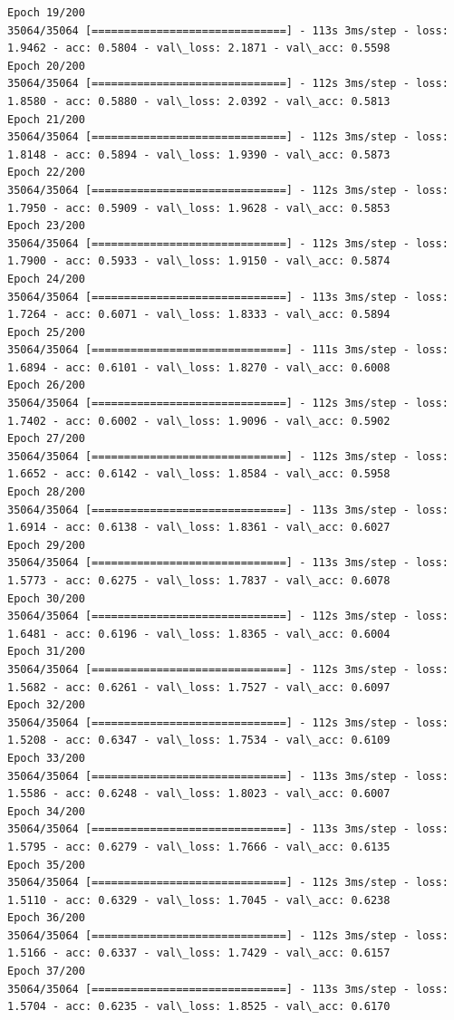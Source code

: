 \documentclass[11pt]{article}
\begin{document}
\begin{Verbatim}[commandchars=\\\{\}]
Epoch 19/200
35064/35064 [==============================] - 113s 3ms/step - loss: 1.9462 - acc: 0.5804 - val\_loss: 2.1871 - val\_acc: 0.5598
Epoch 20/200
35064/35064 [==============================] - 112s 3ms/step - loss: 1.8580 - acc: 0.5880 - val\_loss: 2.0392 - val\_acc: 0.5813
Epoch 21/200
35064/35064 [==============================] - 112s 3ms/step - loss: 1.8148 - acc: 0.5894 - val\_loss: 1.9390 - val\_acc: 0.5873
Epoch 22/200
35064/35064 [==============================] - 112s 3ms/step - loss: 1.7950 - acc: 0.5909 - val\_loss: 1.9628 - val\_acc: 0.5853
Epoch 23/200
35064/35064 [==============================] - 112s 3ms/step - loss: 1.7900 - acc: 0.5933 - val\_loss: 1.9150 - val\_acc: 0.5874
Epoch 24/200
35064/35064 [==============================] - 113s 3ms/step - loss: 1.7264 - acc: 0.6071 - val\_loss: 1.8333 - val\_acc: 0.5894
Epoch 25/200
35064/35064 [==============================] - 111s 3ms/step - loss: 1.6894 - acc: 0.6101 - val\_loss: 1.8270 - val\_acc: 0.6008
Epoch 26/200
35064/35064 [==============================] - 112s 3ms/step - loss: 1.7402 - acc: 0.6002 - val\_loss: 1.9096 - val\_acc: 0.5902
Epoch 27/200
35064/35064 [==============================] - 112s 3ms/step - loss: 1.6652 - acc: 0.6142 - val\_loss: 1.8584 - val\_acc: 0.5958
Epoch 28/200
35064/35064 [==============================] - 113s 3ms/step - loss: 1.6914 - acc: 0.6138 - val\_loss: 1.8361 - val\_acc: 0.6027
Epoch 29/200
35064/35064 [==============================] - 113s 3ms/step - loss: 1.5773 - acc: 0.6275 - val\_loss: 1.7837 - val\_acc: 0.6078
Epoch 30/200
35064/35064 [==============================] - 112s 3ms/step - loss: 1.6481 - acc: 0.6196 - val\_loss: 1.8365 - val\_acc: 0.6004
Epoch 31/200
35064/35064 [==============================] - 112s 3ms/step - loss: 1.5682 - acc: 0.6261 - val\_loss: 1.7527 - val\_acc: 0.6097
Epoch 32/200
35064/35064 [==============================] - 112s 3ms/step - loss: 1.5208 - acc: 0.6347 - val\_loss: 1.7534 - val\_acc: 0.6109
Epoch 33/200
35064/35064 [==============================] - 113s 3ms/step - loss: 1.5586 - acc: 0.6248 - val\_loss: 1.8023 - val\_acc: 0.6007
Epoch 34/200
35064/35064 [==============================] - 113s 3ms/step - loss: 1.5795 - acc: 0.6279 - val\_loss: 1.7666 - val\_acc: 0.6135
Epoch 35/200
35064/35064 [==============================] - 112s 3ms/step - loss: 1.5110 - acc: 0.6329 - val\_loss: 1.7045 - val\_acc: 0.6238
Epoch 36/200
35064/35064 [==============================] - 112s 3ms/step - loss: 1.5166 - acc: 0.6337 - val\_loss: 1.7429 - val\_acc: 0.6157
Epoch 37/200
35064/35064 [==============================] - 113s 3ms/step - loss: 1.5704 - acc: 0.6235 - val\_loss: 1.8525 - val\_acc: 0.6170

\end{Verbatim}
\end{document}
